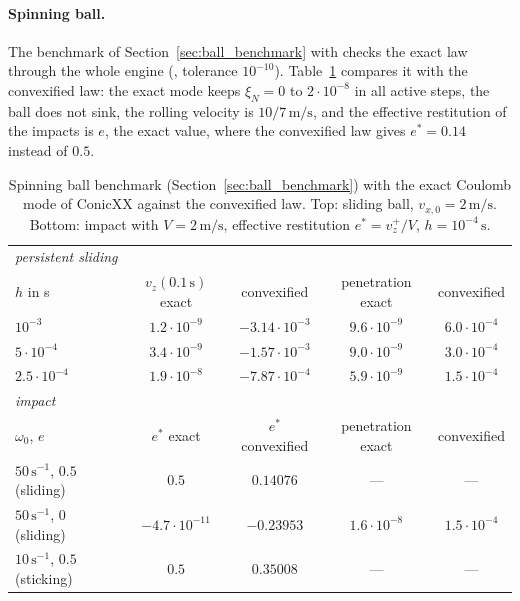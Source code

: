 \paragraph{Spinning ball.} The benchmark of Section~\ref{sec:ball_benchmark} with  checks the exact law through the whole engine (, tolerance $10^{-10}$). Table~\ref{tab:ec_ball} compares it with the convexified law: the exact mode keeps $\xi_N = 0$ to $2 \cdot 10^{-8}$ in all active steps, the ball does not sink, the rolling velocity is $10/7\,\mathrm{m/s}$, and the effective restitution of the impacts is $e$, the exact value, where the convexified law gives $e^* = 0.14$ instead of $0.5$.
%
\begin{table}[t]
	\centering
	\small
	\caption{Spinning ball benchmark (Section~\ref{sec:ball_benchmark}) with the exact Coulomb mode of ConicXX against the convexified law. Top: sliding ball, $v_{x,0} = 2\,\mathrm{m/s}$. Bottom: impact with $V = 2\,\mathrm{m/s}$, effective restitution $e^* = v_z^+/V$, $h = 10^{-4}\,\mathrm{s}$.}
	\label{tab:ec_ball}
	\begin{tabular}{lcccc}
		\toprule
		\multicolumn{5}{l}{\emph{persistent sliding}} \\
		$h$ in s & $v_z(0.1\,\mathrm{s})$ exact & convexified & penetration exact & convexified \\
		\midrule
		$10^{-3}$ & $1.2 \cdot 10^{-9}$ & $-3.14 \cdot 10^{-3}$ & $9.6 \cdot 10^{-9}$ & $6.0 \cdot 10^{-4}$ \\
		$5 \cdot 10^{-4}$ & $3.4 \cdot 10^{-9}$ & $-1.57 \cdot 10^{-3}$ & $9.0 \cdot 10^{-9}$ & $3.0 \cdot 10^{-4}$ \\
		$2.5 \cdot 10^{-4}$ & $1.9 \cdot 10^{-8}$ & $-7.87 \cdot 10^{-4}$ & $5.9 \cdot 10^{-9}$ & $1.5 \cdot 10^{-4}$ \\
		\midrule
		\multicolumn{5}{l}{\emph{impact}} \\
		$\omega_0$, $e$ & $e^*$ exact & $e^*$ convexified & penetration exact & convexified \\
		\midrule
		$50\,\mathrm{s^{-1}}$, $0.5$ (sliding) & $0.5$ & $0.14076$ & --- & --- \\
		$50\,\mathrm{s^{-1}}$, $0$ (sliding) & $-4.7 \cdot 10^{-11}$ & $-0.23953$ & $1.6 \cdot 10^{-8}$ & $1.5 \cdot 10^{-4}$ \\
		$10\,\mathrm{s^{-1}}$, $0.5$ (sticking) & $0.5$ & $0.35008$ & --- & --- \\
		\bottomrule
	\end{tabular}
\end{table}
%
